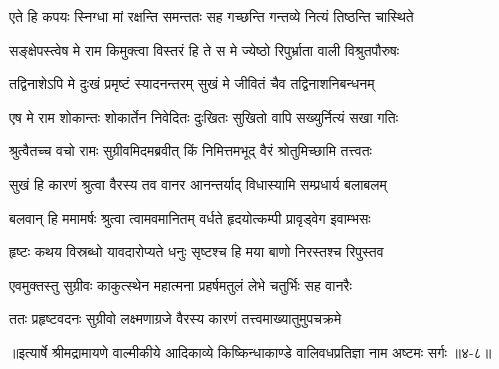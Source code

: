 \twolineshloka
{एते हि कपयः स्निग्धा मां रक्षन्ति समन्ततः}
{सह गच्छन्ति गन्तव्ये नित्यं तिष्ठन्ति चास्थिते} %

\twolineshloka
{सङ्क्षेपस्त्वेष मे राम किमुक्त्वा विस्तरं हि ते}
{स मे ज्येष्ठो रिपुर्भ्राता वाली विश्रुतपौरुषः} %

\twolineshloka
{तद्विनाशेऽपि मे दुःखं प्रमृष्टं स्यादनन्तरम्}
{सुखं मे जीवितं चैव तद्विनाशनिबन्धनम्} %

\twolineshloka
{एष मे राम शोकान्तः शोकार्तेन निवेदितः}
{दुःखितः सुखितो वापि सख्युर्नित्यं सखा गतिः} %

\twolineshloka
{श्रुत्वैतच्च वचो रामः सुग्रीवमिदमब्रवीत्}
{किं निमित्तमभूद् वैरं श्रोतुमिच्छामि तत्त्वतः} %

\twolineshloka
{सुखं हि कारणं श्रुत्वा वैरस्य तव वानर}
{आनन्तर्याद् विधास्यामि सम्प्रधार्य बलाबलम्} %

\twolineshloka
{बलवान् हि ममामर्षः श्रुत्वा त्वामवमानितम्}
{वर्धते हृदयोत्कम्पी प्रावृड्वेग इवाम्भसः} %

\twolineshloka
{हृष्टः कथय विस्रब्धो यावदारोप्यते धनुः}
{सृष्टश्च हि मया बाणो निरस्तश्च रिपुस्तव} %

\twolineshloka
{एवमुक्तस्तु सुग्रीवः काकुत्स्थेन महात्मना}
{प्रहर्षमतुलं लेभे चतुर्भिः सह वानरैः} %

\twolineshloka
{ततः प्रहृष्टवदनः सुग्रीवो लक्ष्मणाग्रजे}
{वैरस्य कारणं तत्त्वमाख्यातुमुपचक्रमे} %


॥इत्यार्षे श्रीमद्रामायणे वाल्मीकीये आदिकाव्ये किष्किन्धाकाण्डे वालिवधप्रतिज्ञा नाम अष्टमः सर्गः ॥४-८॥
